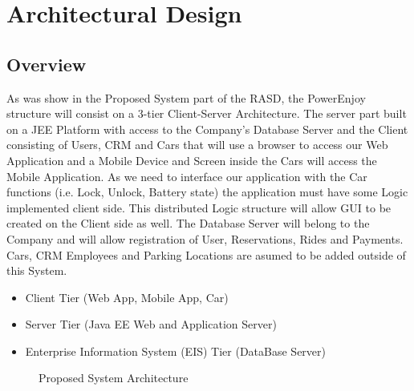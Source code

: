 \documentclass[a4paper]{article}
\begin{document}
\newpage
\section{Architectural Design}
\subsection{Overview}
As was show in the Proposed System part of the RASD, the PowerEnjoy structure will consist on a 3-tier Client-Server Architecture. The server part built on a JEE Platform with access to the Company's Database Server and the Client consisting of Users, CRM and Cars that will use a browser to access our Web Application and a Mobile Device and Screen inside the Cars will access the Mobile Application.
As we need to interface our application with the Car functions (i.e. Lock, Unlock, Battery state) the application must have some Logic implemented client side. This distributed Logic structure will allow GUI to be created on the Client side as well.
The Database Server will belong to the Company and will allow registration of User, Reservations, Rides and Payments. Cars, CRM Employees and Parking Locations are asumed to be added outside of this System.

\begin{itemize}
\item Client Tier (Web App, Mobile App, Car)
\item Server Tier (Java EE Web and Application Server)
\item Enterprise Information System (EIS) Tier (DataBase Server)
\end{itemize}

\begin{figure}[h]
\centering
\vspace*{\fill}
\noindent{}%
\caption {Proposed System Architecture}
\vspace*{0.5cm}
\end{figure}
\newpage
\end{document}
